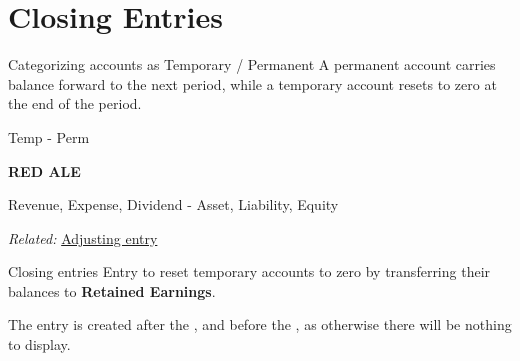 \section{Closing Entries}
\label{sec:closing_entries}

\begin{definition}
    {Categorizing accounts as Temporary / Permanent}
    A permanent account carries balance forward to the next period, while a temporary account resets to zero at the end of the period.

    \vspace{0.5em}
    \begin{center}
        \small
        Temp - Perm
        \normalsize

        \textbf{RED ALE}

        Revenue, Expense, Dividend - Asset, Liability, Equity
    \end{center}
    \label{def:temp_perm}
    \tcblower
    \textit{Related: } \hyperref[thm:adjusting_entry]{Adjusting entry}
\end{definition}

\begin{definition}
    {Closing entries}
    Entry to reset temporary accounts to zero by transferring their balances to \textbf{Retained Earnings}.

    The entry is created after the , and before the , as otherwise there will be nothing to display.
\end{definition}

